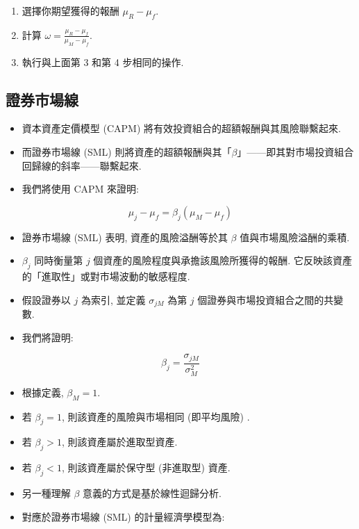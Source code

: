 \documentclass[letterpaper]{article}
\begin{document}
		\begin{enumerate}
			\item 選擇你期望獲得的報酬 $\mu_{R}-\mu_{f}$. 
			\item 計算 $\omega=\frac{\mu_{R}-\mu_{f}}{\mu_{M}-\mu_{f}}$. 
			\item 執行與上面第 3 和第 4 步相同的操作. 
		\end{enumerate}
		
			\subsection{證券市場線}
		
		\begin{itemize}
			\item 資本資產定價模型 (CAPM) 將有效投資組合的超額報酬與其風險聯繫起來. 
			\item 而證券市場線 (SML) 則將資產的超額報酬與其「$\beta$」——即其對市場投資組合回歸線的斜率——聯繫起來. 
			\item 我們將使用 CAPM 來證明: 
		\end{itemize}
		
		
		$$
		\mu_{j}-\mu_{f}=\beta_{j}\left (\mu_{M}-\mu_{f}\right) 
		$$
		
		\begin{itemize}
			\item 證券市場線 (SML) 表明, 資產的風險溢酬等於其 $\beta$ 值與市場風險溢酬的乘積. 
			\item $\beta_{j}$ 同時衡量第 $j$ 個資產的風險程度與承擔該風險所獲得的報酬. 它反映該資產的「進取性」或對市場波動的敏感程度. 
			\item 假設證券以 $j$ 為索引, 並定義 $\sigma_{j M}$ 為第 $j$ 個證券與市場投資組合之間的共變數. 
			\item 我們將證明: 
		\end{itemize}
		
		
		$$
		\beta_{j}=\frac{\sigma_{j M}}{\sigma_{M}^{2}}
		$$
		
		\begin{itemize}
			\item 根據定義, $\beta_{M}=1$. 
			\item 若 $\beta_{j}=1$, 則該資產的風險與市場相同 (即平均風險) . 
			\item 若 $\beta_{j}>1$, 則該資產屬於進取型資產. 
			\item 若 $\beta_{j}<1$, 則該資產屬於保守型 (非進取型) 資產. 
			\item 另一種理解 $\beta$ 意義的方式是基於線性迴歸分析. 
			\item 對應於證券市場線 (SML) 的計量經濟學模型為: 
		\end{itemize}
		
\end{document}
